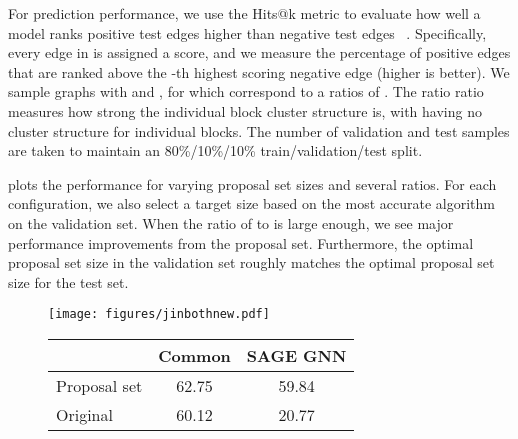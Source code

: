 \documentclass{article}
\begin{document}
For prediction performance, we use the Hits@k metric to evaluate how well a
model ranks positive test edges  higher than negative test
edges ~\cite{Hu2020OpenGB}. Specifically, every edge in
 is assigned a score, and we measure the
percentage of positive edges that are ranked above the -th highest scoring
negative edge (higher is better).
We sample graphs with  and , for  which correspond to a ratios  of .
The ratio  ratio measures how strong the individual block cluster structure is, with  having no cluster structure for individual blocks.
The number of validation and test samples are taken to maintain an 80\%/10\%/10\% train/validation/test split.

 plots the performance for varying proposal set sizes and several ratios.
For each configuration, we also select a target size  based on the most accurate algorithm on the validation set.
When the ratio of  to  is large enough, we see major performance improvements from the proposal set.
Furthermore, the optimal proposal set size in the validation set roughly matches the optimal proposal set size for the test set.


\begin{figure}[t]
\RawFloats
\begin{minipage}{0.5\linewidth}
    \centering
    \texttt{[image: figures/jinbothnew.pdf]}
    \label{fig:jin}
\end{minipage}\hfill
\begin{minipage}{0.45\linewidth}
\label{tab:jin}
\begin{tabular}{l cc}
\toprule
   & Common & SAGE GNN \\
\midrule
Proposal set & 62.75 {\tiny } & 59.84 {\tiny } \\
Original & 60.12 {\tiny } & 20.77 {\tiny } \\
\bottomrule
\end{tabular}
\end{minipage}
\end{figure}
\end{document}

